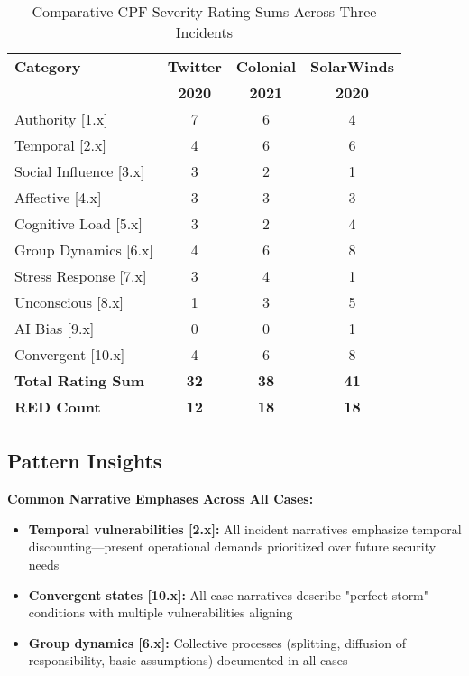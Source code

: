 \documentclass[11pt,a4paper]{article}
\begin{document}
\begin{table}[ht]
\centering
\caption{Comparative CPF Severity Rating Sums Across Three Incidents}
\label{tab:comparison}
\begin{tabular}{lccc}
\toprule
\textbf{Category} & \textbf{Twitter} & \textbf{Colonial} & \textbf{SolarWinds} \\
 & \textbf{2020} & \textbf{2021} & \textbf{2020} \\
\midrule
Authority [1.x] & 7 & 6 & 4 \\
Temporal [2.x] & 4 & 6 & 6 \\
Social Influence [3.x] & 3 & 2 & 1 \\
Affective [4.x] & 3 & 3 & 3 \\
Cognitive Load [5.x] & 3 & 2 & 4 \\
Group Dynamics [6.x] & 4 & 6 & 8 \\
Stress Response [7.x] & 3 & 4 & 1 \\
Unconscious [8.x] & 1 & 3 & 5 \\
AI Bias [9.x] & 0 & 0 & 1 \\
Convergent [10.x] & 4 & 6 & 8 \\
\midrule
\textbf{Total Rating Sum} & \textbf{32} & \textbf{38} & \textbf{41} \\
\textbf{RED Count} & \textbf{12} & \textbf{18} & \textbf{18} \\
\bottomrule
\end{tabular}
\end{table}

\FloatBarrier

\subsection{Pattern Insights}

\textbf{Common Narrative Emphases Across All Cases:}

\begin{itemize}
\item \textbf{Temporal vulnerabilities [2.x]:} All incident narratives emphasize temporal discounting—present operational demands prioritized over future security needs
\item \textbf{Convergent states [10.x]:} All case narratives describe "perfect storm" conditions with multiple vulnerabilities aligning
\item \textbf{Group dynamics [6.x]:} Collective processes (splitting, diffusion of responsibility, basic assumptions) documented in all cases
\end{itemize}
\end{document}
